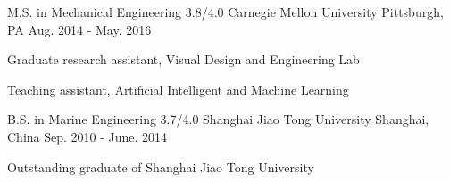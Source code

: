 

\begin{cventries}

  \cventry
    {M.S. in Mechanical Engineering 3.8/4.0} %
    {Carnegie Mellon University } %
    {Pittsburgh, PA} %
    {Aug. 2014 - May. 2016} %
    {
      \begin{cvitems} %
        \item {Graduate research assistant, Visual Design and Engineering Lab}
        \item {Teaching assistant, Artificial Intelligent and Machine Learning}
      \end{cvitems}
    }

  \cventry
    {B.S. in Marine Engineering 3.7/4.0} %
    {Shanghai Jiao Tong University} %
    {Shanghai, China} %
    {Sep. 2010 - June. 2014} %
    {
      \begin{cvitems} %
        \item {Outstanding graduate of Shanghai Jiao Tong University}
      \end{cvitems}
    }

\end{cventries}

